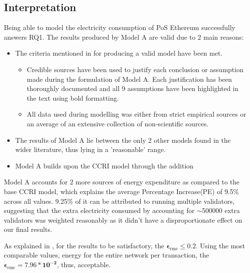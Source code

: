 \subsection{Interpretation}

Being able to model the electricity consumption of PoS Ethereum successfully answers RQ1. The results produced by Model A are valid due to 2 main reasons:
\begin{itemize}
    \item The criteria mentioned in  for producing a valid model have been met. 
    \begin{itemize}
        \item Credible sources have been used to justify each conclusion or assumption made during the formulation of Model A. Each justification has been thoroughly documented and all 9 assumptions have been highlighted in the text using bold formatting.
        \item All data used during modelling was either from strict empirical sources or an average of an extensive collection of non-scientific sources.
    \end{itemize}
    \item The results of Model A lie between the only 2 other models found in the wider literature, thus lying in a 'reasonable' range.
    \item Model A builds upon the CCRI model through the addition
\end{itemize}

Model A accounts for 2 more sources of energy expenditure as compared to the base CCRI model, which explains the average Percentage Increase(PE) of 9.5\% across all values. 9.25\% of it can be attributed to running multiple validators, suggesting that the extra electricity consumed by accounting for $\sim$500000 extra validators was weighted reasonably as it didn't have a disproportionate effect on our final results. 

As explained in , for the results to be satisfactory, the $\boldsymbol{\epsilon_\mathrm{rme} \leq 0.2}$. Using the most comparable values, energy for the entire network per transaction, the $\boldsymbol{\epsilon_\mathrm{rme} = 7.96 * 10^{-2}}$, thus, acceptable.


